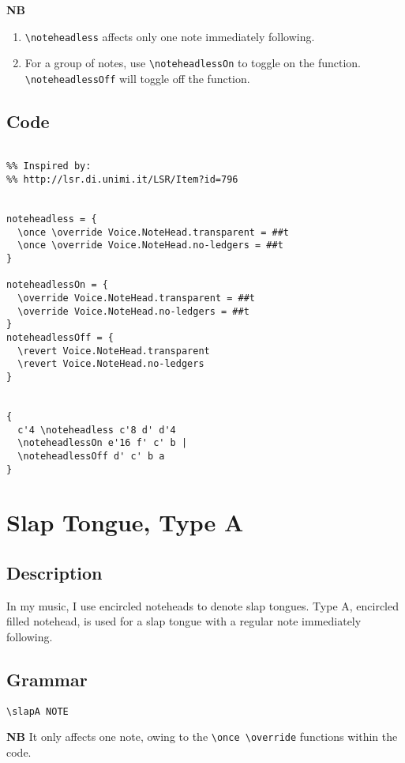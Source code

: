 \documentclass[11pt, oneside]{book}   	%
\begin{document}
\textbf{NB} 
\begin{enumerate} 
\item \verb|\noteheadless| affects only one note immediately following. 
\item For a group of notes, use \verb|\noteheadlessOn| to toggle on the function.  \verb|\noteheadlessOff| will toggle off the function.
\end{enumerate}

\subsection{Code}
\begin{verbatim}

%% Inspired by:
%% http://lsr.di.unimi.it/LSR/Item?id=796


noteheadless = {
  \once \override Voice.NoteHead.transparent = ##t
  \once \override Voice.NoteHead.no-ledgers = ##t
}

noteheadlessOn = {
  \override Voice.NoteHead.transparent = ##t
  \override Voice.NoteHead.no-ledgers = ##t
}
noteheadlessOff = {
  \revert Voice.NoteHead.transparent
  \revert Voice.NoteHead.no-ledgers
}


{
  c'4 \noteheadless c'8 d' d'4
  \noteheadlessOn e'16 f' c' b |
  \noteheadlessOff d' c' b a
}

\end{verbatim}
\vfill \break


\section {Slap Tongue, Type A}
\hfill

\subsection{Description}
	In my music, I use encircled noteheads to denote slap tongues. Type A, encircled filled notehead, is used for a slap tongue with a regular note immediately following. 
	
\subsection{Grammar}
\begin{verbatim}
\slapA NOTE
\end{verbatim}
\textbf{NB} It only affects one note, owing to the \verb|\once \override| functions within the code.
\end{document}
